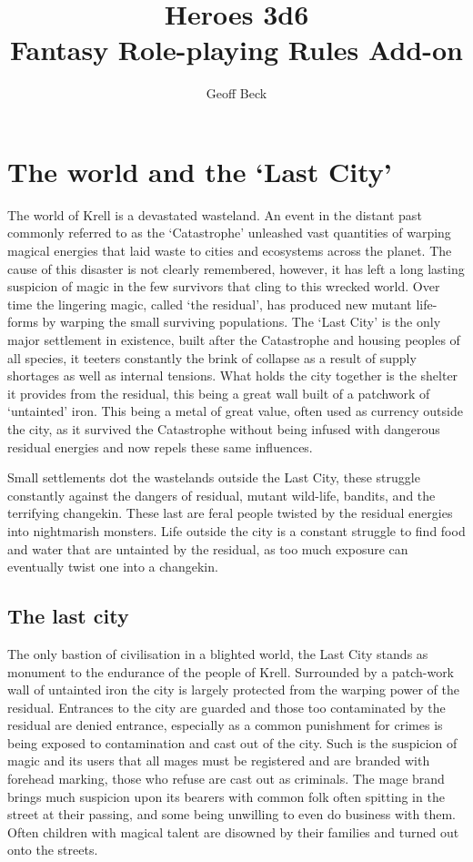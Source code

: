 \documentclass[a4paper,11pt,oneside]{book}
\title{\textbf{\huge Heroes 3d6\\Fantasy Role-playing Rules Add-on}}
\author{Geoff Beck}
\date{}
\begin{document}
\maketitle
\frontmatter
\tableofcontents
\mainmatter

\chapter{The world and the `Last City'}
The world of Krell is a devastated wasteland. An event in the distant past commonly referred to as the `Catastrophe' unleashed vast quantities of warping magical energies that laid waste to cities and ecosystems across the planet. The cause of this disaster is not clearly remembered, however, it has left a long lasting suspicion of magic in the few survivors that cling to this wrecked world. Over time the lingering magic, called `the residual', has produced new mutant life-forms by warping the small surviving populations. The `Last City' is the only major settlement in existence, built after the Catastrophe and housing peoples of all species, it teeters constantly the brink of collapse as a result of supply shortages as well as internal tensions. What holds the city together is the shelter it provides from the residual, this being a great wall built of a patchwork of `untainted' iron. This being a metal of great value, often used as currency outside the city, as it survived the Catastrophe without being infused with dangerous residual energies and now repels these same influences.    

Small settlements dot the wastelands outside the Last City, these struggle constantly against the dangers of residual, mutant wild-life, bandits, and the terrifying changekin. These last are feral people twisted by the residual energies into nightmarish monsters. Life outside the city is a constant struggle to find food and water that are untainted by the residual, as too much exposure can eventually twist one into a changekin.

\section{The last city}
The only bastion of civilisation in a blighted world, the Last City stands as monument to the endurance of the people of Krell. Surrounded by a patch-work wall of untainted iron the city is largely protected from the warping power of the residual. Entrances to the city are guarded and those too contaminated by the residual are denied entrance, especially as a common punishment for crimes is being exposed to contamination and cast out of the city. Such is the suspicion of magic and its users that all mages must be registered and are branded with forehead marking, those who refuse are cast out as criminals. The mage brand brings much suspicion upon its bearers with common folk often spitting in the street at their passing, and some being unwilling to even do business with them. Often children with magical talent are disowned by their families and turned out onto the streets. 
\end{document}
